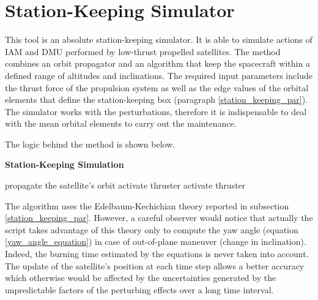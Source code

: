 \section{Station-Keeping Simulator} \label{sk_simulator_par}
This tool is an absolute station-keeping simulator.
It is able to simulate actions of IAM and DMU performed by low-thrust propelled satellites.
The method combines an orbit propagator and an algorithm that keep the spacecraft within a defined range of altitudes and inclinations.
The required input parameters include the thrust force of the propulsion system as well as the edge values of the orbital elements that define the station-keeping box (paragraph \ref{station_keeping_par}).
The simulator works with the perturbations, therefore it is indispensable to deal with the mean orbital elements to carry out the maintenance.

The logic behind the method is shown below.
\begin{algorithm}[H]
      \caption{\textbf{Station-Keeping Simulation}}
      \begin{algorithmic}[1]
                        \State propagate the satellite's orbit
                                \State activate thruster
                            \EndWhile
                        \EndIf           
                                \State activate thruster
                            \EndWhile
                    \EndIf
                  \EndFor
            \EndProcedure
      \end{algorithmic}
\end{algorithm}

The algorithm uses the Edelbaum-Kechichian theory reported in subsection \ref{station_keeping_par}.
However, a careful observer would notice that actually the script takes advantage of this theory only to compute the yaw angle (equation \ref{yaw_angle_equation}) in case of out-of-plane maneuver (change in inclination).
Indeed, the burning time estimated by the equations is never taken into account.
The update of the satellite's position at each time step allows a better accuracy which otherwise would be affected by the uncertainties generated by the unpredictable factors of the perturbing effects over a long time interval.

